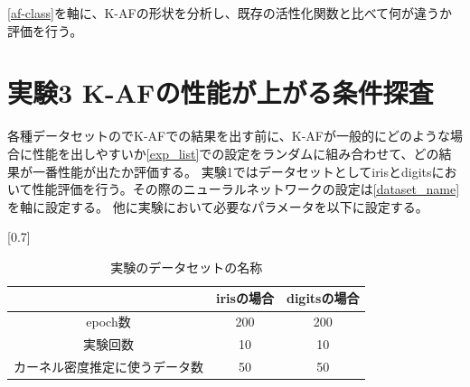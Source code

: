 \vspace{-5mm} 

\ref{af-class}を軸に、K-AFの形状を分析し、既存の活性化関数と比べて何が違うか評価を行う。






\section{実験3 K-AFの性能が上がる条件探査}
\label{exp3}
各種データセットのでK-AFでの結果を出す前に、K-AFが一般的にどのような場合に性能を出しやすいか\ref{exp_list}での設定をランダムに組み合わせて、どの結果が一番性能が出たか評価する。
実験1ではデータセットとしてirisとdigitsにおいて性能評価を行う。その際のニューラルネットワークの設定は\ref{dataset_name}を軸に設定する。
他に実験において必要なパラメータを以下に設定する。


\begin{table}[htbp]
    \begin{center}
        \caption{実験のデータセットの名称}
        \vspace{5mm} 
        \scalebox{0.7}[0.7]{
            \begin{tabular}{||c | c |c||}
              & irisの場合 & digitsの場合 \\
            \hline
            epoch数                           & 200       & 200  \\
            実験回数                           & 10     & 10 \\
            カーネル密度推定に使うデータ数        & 50           & 50  \\
            \end{tabular}
        }
    \end{center}
\end{table}


\vspace{-15mm} 








